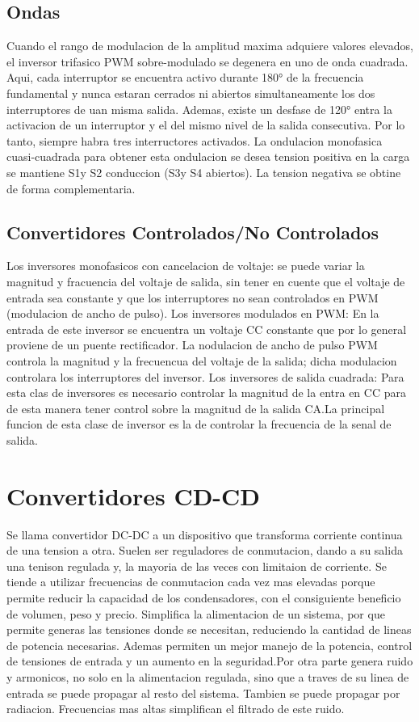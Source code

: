 \documentclass[12pt,a4paper]{report}
\begin{document}
\section{Ondas}
Cuando el rango de modulacion de la amplitud maxima adquiere valores elevados, el inversor trifasico PWM sobre-modulado se degenera en uno de onda cuadrada. Aqui, cada interruptor se encuentra activo durante 180° de la frecuencia fundamental y nunca estaran cerrados ni abiertos simultaneamente los dos interruptores de uan misma salida. Ademas, existe un desfase de 120° entra la activacion de un interruptor y el del mismo nivel de la salida consecutiva. Por lo tanto, siempre habra tres interructores activados.
La ondulacion monofasica cuasi-cuadrada para obtener esta ondulacion se desea tension positiva en la carga se mantiene S1y S2 conduccion (S3y S4 abiertos). La tension negativa  se obtine de forma complementaria.
\section{Convertidores Controlados/No Controlados}
Los inversores monofasicos con cancelacion de voltaje: se puede variar la magnitud y fracuencia del voltaje de salida, sin tener en cuente que el voltaje de entrada sea constante y que los interruptores no sean controlados en PWM (modulacion de ancho de pulso). Los inversores modulados en PWM: En la entrada de este inversor se encuentra un voltaje CC constante que por lo general proviene de un puente rectificador. La nodulacion de ancho de pulso PWM controla la magnitud y la frecuencua del voltaje de la salida; dicha modulacion controlara los interruptores del inversor. Los inversores de salida cuadrada: Para esta clas de inversores es necesario controlar la magnitud de la entra en CC para de esta manera tener control sobre la magnitud de la salida CA.La principal funcion de esta clase de inversor es la de controlar la frecuencia de la senal de salida. 
\chapter{Convertidores CD-CD}
Se llama convertidor DC-DC a un dispositivo que transforma corriente continua de una tension a otra. Suelen ser reguladores de conmutacion, dando a su salida una tenison regulada y, la mayoria de las veces con limitaion de corriente. Se tiende a utilizar frecuencias de conmutacion cada vez mas elevadas porque permite reducir la capacidad de los condensadores, con el consiguiente beneficio de volumen, peso y precio. Simplifica la alimentacion de un sistema, por que permite generas las tensiones donde se necesitan, reduciendo la cantidad de lineas de potencia necesarias. Ademas permiten un mejor manejo de la potencia, control de tensiones de entrada y un aumento en la seguridad.Por otra parte genera ruido y armonicos, no solo en la alimentacion regulada, sino que a traves de su linea de entrada se puede propagar al resto del sistema. Tambien se puede propagar por radiacion. Frecuencias mas altas simplifican el filtrado de este ruido.
\end{document}
